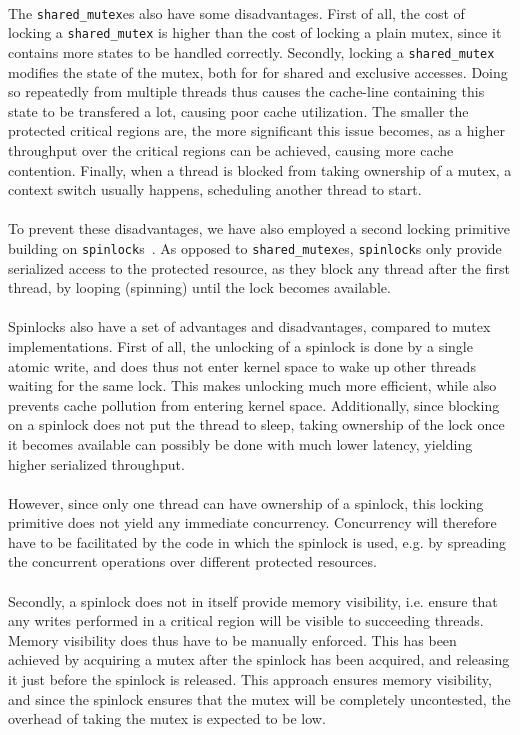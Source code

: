 \documentclass[11pt]{report} %
\begin{document}
\\
The \verb|shared_mutex|es also have some disadvantages. First of all, the cost of locking a \verb|shared_mutex| is higher than the cost of locking a plain mutex, since it contains more states to be handled correctly. Secondly, locking a \verb|shared_mutex| modifies the state of the mutex, both for for shared and exclusive accesses. Doing so repeatedly from multiple threads thus causes the cache-line containing this state to be transfered a lot, causing poor cache utilization. The smaller the protected critical regions are, the more significant this issue becomes, as a higher throughput over the critical regions can be achieved, causing more cache contention. Finally, when a thread is blocked from taking ownership of a mutex, a context switch usually happens, scheduling another thread to start.\\
\\
To prevent these disadvantages, we have also employed a second locking primitive building on \verb|spinlock|s~\cite{spinlock}. As opposed to \verb|shared_mutex|es, \verb|spinlock|s only provide serialized access to the protected resource, as they block any thread after the first thread, by looping (spinning) until the lock becomes available. \\
\\
Spinlocks also have a set of advantages and disadvantages, compared to mutex implementations. First of all, the unlocking of a spinlock is done by a single atomic write, and does thus not enter kernel space to wake up other threads waiting for the same lock. This makes unlocking much more efficient, while also prevents cache pollution from entering kernel space. Additionally, since blocking on a spinlock does not put the thread to sleep, taking ownership of the lock once it becomes available can possibly be done with much lower latency, yielding higher serialized throughput. \\
\\
However, since only one thread can have ownership of a spinlock, this locking primitive does not yield any immediate concurrency. Concurrency will therefore have to be facilitated by the code in which the spinlock is used, e.g. by spreading the concurrent operations over different protected resources. \\
\\
Secondly, a spinlock does not in itself provide memory visibility, i.e. ensure that any writes performed in a critical region will be visible to succeeding threads. Memory visibility does thus have to be manually enforced. This has been achieved by acquiring a mutex after the spinlock has been acquired, and releasing it just before the spinlock is released. This approach ensures memory visibility, and since the spinlock ensures that the mutex will be completely uncontested, the overhead of taking the mutex is expected to be low.
\end{document}
